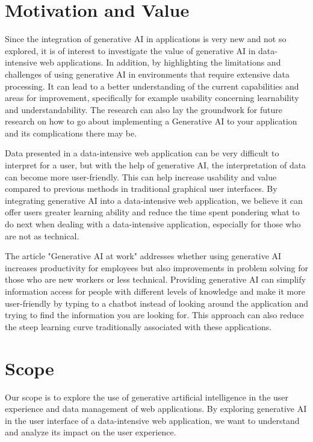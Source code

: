 \section{Motivation and Value}
Since the integration of generative AI in applications is very new and not so explored, it is of interest to investigate the value of generative AI in data-intensive web applications. In addition, by highlighting the limitations and challenges of using generative AI in environments that require extensive data processing. It can lead to a better understanding of the current capabilities and areas for improvement, specifically for example usability concerning learnability and understandability. The research can also lay the groundwork for future research on how to go about implementing a Generative AI to your application and its complications there may be.

\begin{comment}
    Kanske nämna om att det kan vara bra att veta om man jobbar bättre och får bättre resultat när man använder generativ ai ?
\end{comment}

Data presented in a data-intensive web application can be very difficult to interpret for a user, but with the help of generative AI, the interpretation of data can become more user-friendly. This can help increase usability and value compared to previous methods in traditional graphical user interfaces. By integrating generative AI into a data-intensive web application, we believe it can offer users greater learning ability and reduce the time spent pondering what to do next when dealing with a data-intensive application, especially for those who are not as technical.

The article "Generative AI at work"\cite{generativAIAtWork} addresses whether using generative AI increases productivity for employees but also improvements in problem solving for those who are new workers or less technical. Providing generative AI can simplify information access for people with different levels of knowledge and make it more user-friendly by typing to a chatbot instead of looking around the application and trying to find the information you are looking for. This approach can also reduce the steep learning curve traditionally associated with these applications.

\section{Scope}
Our scope is to explore the use of generative artificial intelligence in the user experience and data management of web applications. By exploring generative AI in the user interface of a data-intensive web application, we want to understand and analyze its impact on the user experience.

